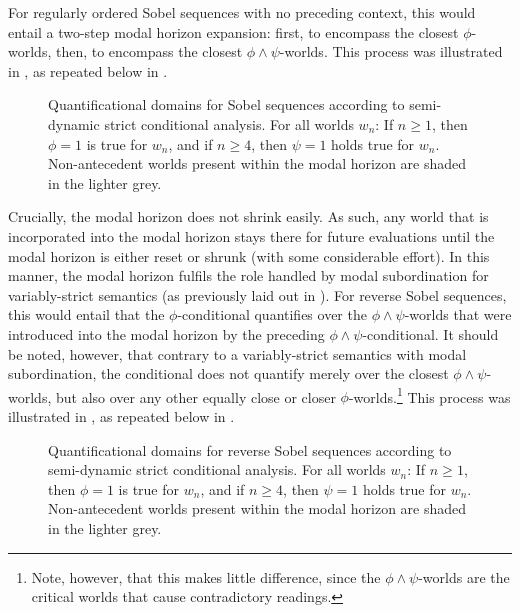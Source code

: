 \noindent For regularly ordered Sobel sequences with no preceding context, this would entail a two-step modal horizon expansion: first, to encompass the closest $\phi$-worlds, then, to encompass the closest $\phi\land\psi$-worlds. This process was illustrated in , as repeated below in .
\begin{figure}[!htb]

\caption{Quantificational domains for Sobel sequences according to  semi-dynamic strict conditional analysis. For all worlds $w_n$: If $n\geqslant1$, then $\phi=1$ is true for $w_n$, and if $n\geqslant 4$, then $\psi=1$ holds true for $w_n$. Non-antecedent worlds present within the modal horizon are shaded in the lighter grey.}
\end{figure}

\noindent Crucially, the modal horizon does not shrink easily. As such, any world that is incorporated into the modal horizon stays there for future evaluations until the modal horizon is either reset or shrunk (with some considerable effort). In this manner, the modal horizon fulfils the role handled by modal subordination for variably-strict semantics (as previously laid out in ). For reverse Sobel sequences, this would entail that the $\phi$-conditional quantifies over the $\phi\land\psi$-worlds that were introduced into the modal horizon by the preceding $\phi\land\psi$-conditional. It should be noted, however, that contrary to a variably-strict semantics with modal subordination, the conditional does not quantify merely over the closest $\phi\land\psi$-worlds, but also over any other equally close or closer $\phi$-worlds.\footnote{Note, however, that this makes little difference, since the $\phi\land\psi$-worlds are the critical worlds that cause contradictory readings.} This process was illustrated in , as repeated below in .
\begin{figure}[!htb]

\caption{Quantificational domains for reverse Sobel sequences according to  semi-dynamic strict conditional analysis. For all worlds $w_n$: If $n\geqslant1$, then $\phi=1$ is true for $w_n$, and if $n\geqslant 4$, then $\psi=1$ holds true for $w_n$. Non-antecedent worlds present within the modal horizon are shaded in the lighter grey.}
\end{figure}

